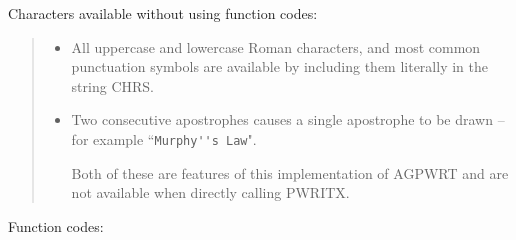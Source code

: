 \documentclass[11pt]{article}
\renewcommand{\_}{{\tt\char'137}}     %
\begin{document}
Characters available without using function codes:

\begin{quote}
\begin{itemize}
\item All uppercase and lowercase Roman characters, and most common
punctuation symbols are available by including them literally
in the string CHRS.
\item Two consecutive apostrophes causes a single apostrophe to be
drawn -- for example ``\verb+Murphy''s Law+".

Both of these are features of this implementation of AGPWRT and
are not available when directly calling PWRITX.
\end{itemize}
\end{quote}

Function codes:
\end{document}
